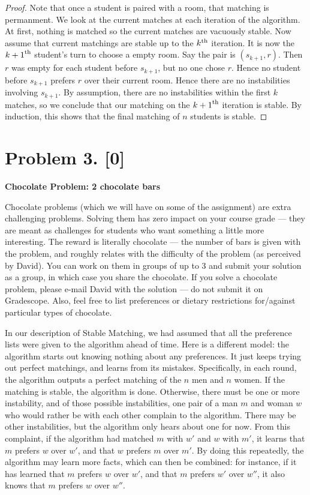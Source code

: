 \documentclass[10pt]{article}
\providecommand{\Kth}[1]{\ensuremath{{#1}^{\rm th}}}
\begin{document}
\begin{enumerate}
\begin{proof}
  Note that once a student is paired with a room, that matching is permanment. We look at the current matches at each iteration of the algorithm. At first, nothing is matched so the current matches are vacuously stable. Now assume that current matchings are stable up to the \Kth{k} iteration. It is now the \Kth{k+1} student's turn to choose a empty room. Say the pair is \((s_{k+1}, r)\). Then \(r\) was empty for each student before \(s_{k + 1}\), but no one chose \(r\). Hence no student before \(s_{k + 1}\) prefers \(r\) over their current room. Hence there are no instabilities involving \(s_{k + 1}\). By assumption, there are no instabilities within the first \(k\) matches, so we conclude that our matching on the \Kth{k + 1} iteration is stable. By induction, this shows that the final matching of \(n\) students is stable.
\end{proof}

\end{enumerate}

\section*{Problem 3. [0]}

\textbf{Chocolate Problem: 2 chocolate bars}

Chocolate problems (which we will have on some of the assignment) are extra challenging problems. Solving them has zero impact on your course grade --- they are meant as challenges for students who want something a little more interesting. The reward is literally chocolate --- the number of bars is given with the problem, and roughly relates with the difficulty of the problem (as perceived by David).
You can work on them in groups of up to 3 and submit your solution as a group, in which case you share the chocolate.
If you solve a chocolate problem, please e-mail David with the solution --- do not submit it on Gradescope. Also, feel free to list preferences or dietary restrictions for/against particular types of chocolate.

In our description of Stable Matching, we had assumed that all the preference lists were given to the algorithm ahead of time. Here is a different model: the algorithm starts out knowing nothing about any preferences. It just keeps trying out perfect matchings, and learns from its mistakes.
Specifically, in each round, the algorithm outputs a perfect matching of the $n$ men and $n$ women. If the matching is stable, the algorithm is done.
Otherwise, there must be one or more instability, and of those possible instabilities, one pair of a man $m$ and woman $w$ who would rather be with each other complain to the algorithm. There may be other instabilities, but the algorithm only hears about one for now.
From this complaint, if the algorithm had matched $m$ with $w'$ and $w$ with $m'$, it learns that $m$ prefers $w$ over $w'$, and that $w$ prefers $m$ over $m'$. By doing this repeatedly, the algorithm may learn more facts, which can then be combined: for instance, if it has learned that $m$ prefers $w$ over $w'$, and that $m$ prefers $w'$ over $w''$, it also knows that $m$ prefers $w$ over $w''$.
\end{document}
